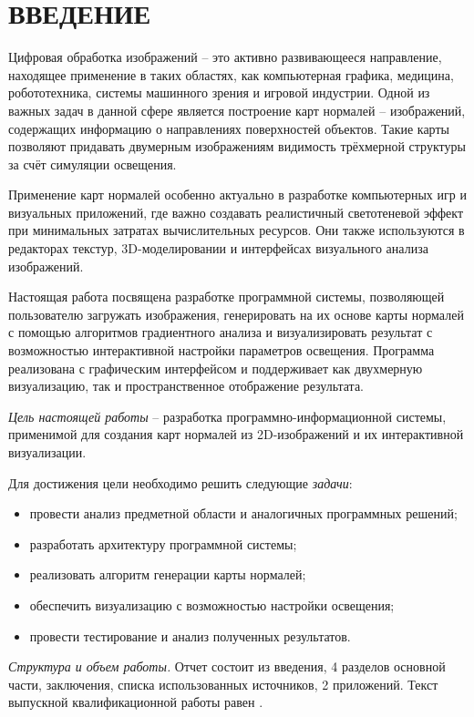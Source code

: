 \section*{ВВЕДЕНИЕ}

Цифровая обработка изображений -- это активно развивающееся направление, находящее применение в таких областях, как компьютерная графика, медицина, робототехника, системы машинного зрения и игровой индустрии. Одной из важных задач в данной сфере является построение карт нормалей -- изображений, содержащих информацию о направлениях поверхностей объектов. Такие карты позволяют придавать двумерным изображениям видимость трёхмерной структуры за счёт симуляции освещения.

Применение карт нормалей особенно актуально в разработке компьютерных игр и визуальных приложений, где важно создавать реалистичный светотеневой эффект при минимальных затратах вычислительных ресурсов. Они также используются в редакторах текстур, 3D-моделировании и интерфейсах визуального анализа изображений.

Настоящая работа посвящена разработке программной системы, позволяющей пользователю загружать изображения, генерировать на их основе карты нормалей с помощью алгоритмов градиентного анализа и визуализировать результат с возможностью интерактивной настройки параметров освещения. Программа реализована с графическим интерфейсом и поддерживает как двухмерную визуализацию, так и пространственное отображение результата.

\emph{Цель настоящей работы} -- разработка программно-информационной системы, применимой для создания карт нормалей из 2D-изображений и их интерактивной визуализации.

Для достижения цели необходимо решить следующие \emph{задачи}:
\begin{itemize}
	\item провести анализ предметной области и аналогичных программных решений;
	\item разработать архитектуру программной системы;
	\item реализовать алгоритм генерации карты нормалей;
	\item обеспечить визуализацию с возможностью настройки освещения;
	\item провести тестирование и анализ полученных результатов.
\end{itemize}

\emph{Структура и объем работы.} Отчет состоит из введения, 4 разделов основной части, заключения, списка использованных источников, 2 приложений. Текст выпускной квалификационной работы равен .

